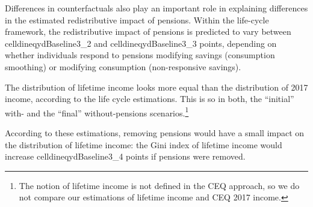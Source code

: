 \documentclass{article}
\newcommand{\Figtext}[1]{%
	\begin{tablenotes}[para,online, flushleft]
		\footnotesize
		\hspace{-0.25cm}
		#1
	\end{tablenotes}
}
\newcommand{\Fignote}[1]{\Figtext{~#1}}
\newcommand{\celldineqydBaseline}[2]{%
  \csname celldineqydBaseline#1_#2\endcsname
}
\begin{document}
Differences in counterfactuals also play an important role in explaining differences in the estimated redistributive impact of pensions. Within the life-cycle framework, the redistributive impact of pensions is predicted to vary between \celldineqydBaseline{3}{2} and \celldineqydBaseline{3}{3} points, depending on whether individuals respond to pensions modifying savings (consumption smoothing) or modifying consumption (non-responsive savings).   

The distribution of lifetime income looks more equal than the distribution of 2017 income, according to the life cycle estimations. This is so in both, the ``initial'' with- and the ``final'' without-pensions scenarios.\footnote{The notion of lifetime income is not defined in the CEQ approach, so we do not compare our estimations of lifetime income and CEQ 2017 income.}  

According to these estimations, removing pensions would have a small impact on the distribution of lifetime income: the Gini index of lifetime income would increase \celldineqydBaseline{3}{4} points if pensions were removed. 


\begin{comment}
    

While removing the pensions program would impact on most households, the concern about ``false poor'' elderly  is related to pensioners households. To illustrate the different predicted effect between the two approaches in these households, we present in figure \ref{figure:income_pensioners} per capita disposable income of pensioners households with and without the pensions program as estimated by the CEQ and life-cycle approaches. On the $45^{\circ}$ line, income with equals income without pensions. Points from the life-cycle estimation lie close  to and around of the $45^{\circ}$ line, indicating that pensioners households earn approximately the same with than without the pensions program. The estimation using the CEQ methodology presents more points below and further from the $45^{\circ}$ degree line than the life-cycle methodology. While we are not estimating poverty, these estimations do suggest that the CEQ approach predicts higher incidence of poverty in old age than the life-cycle approach in the scenario without pensions (more on this in section \ref{sec:poverty}).  

\begin{figure} 
    
    \caption{Disposable income with and without pensions}
\label{figure:income_pensioners}
\centering
\texttt{[image: figures/income\_pensioners\_Baseline.pdf]}  

\Fignote{Note: In thousands of 2017 pesos per year. Pensioners households per capita income with and without pensions. The figure does not include the households with incomes over 10,000 pesos for a cleaner visualization. These are 13 households that nevertheless fall on the $45^{\circ}$ degree line.}
\end{figure}

\end{comment}
\end{document}
